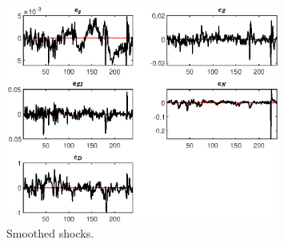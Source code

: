  
\begin{figure}[H]
\centering 
\includegraphics[width=0.80\textwidth]{BRS_growth_res/graphs/BRS_growth_res_SmoothedShocks1}
\caption{Smoothed shocks.}\label{Fig:SmoothedShocks:1}
\end{figure}


